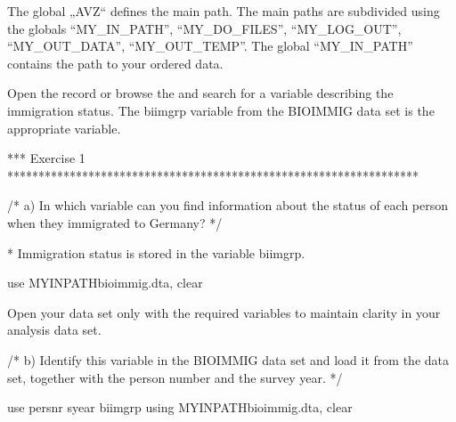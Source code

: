 \documentclass[letterpaper,10pt,openany,onesideH,english]{sphinxmanual}
\begin{document}
The global „AVZ“ defines the main path. The main paths are subdivided using the globals “MY\_IN\_PATH”, “MY\_DO\_FILES”, “MY\_LOG\_OUT”, “MY\_OUT\_DATA”, “MY\_OUT\_TEMP”. The global “MY\_IN\_PATH” contains the path to your ordered data.



Open the record or browse the  and search for a variable describing the immigration status. The biimgrp variable from the BIOIMMIG data set is the appropriate variable.

%
\begin{sphinxVerbatim}[commandchars=\\\{\},numbers=left,firstnumber=1,stepnumber=1]
*** Exercise 1 ******************************************************************

/*
a)	In which variable can you find information about the status of each person when they immigrated to Germany?
*/

* Immigration status is stored in the variable biimgrp.

use \PYGZdl{}MY\PYGZus{}IN\PYGZus{}PATH\PYGZbs{}bioimmig.dta, clear
\end{sphinxVerbatim}


Open your data set only with the required variables to maintain clarity in your analysis data set.

%
\begin{sphinxVerbatim}[commandchars=\\\{\},numbers=left,firstnumber=1,stepnumber=1]
/*
b)	Identify this variable in the BIOIMMIG data set and load it from the data set, together with the person number and the survey year.
*/

use persnr syear biimgrp using \PYGZdl{}MY\PYGZus{}IN\PYGZus{}PATH\PYGZbs{}bioimmig.dta, clear
\end{sphinxVerbatim}

\end{document}
